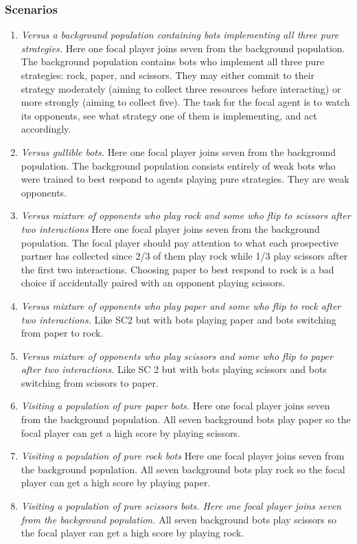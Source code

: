 \documentclass{article} %
\begin{document}
\subsubsection{Scenarios}
\begin{enumerate}
    \item[\textbf{SC0:}] \textit{Versus a background population containing
bots implementing all three pure strategies.}  Here one focal player joins seven from the
background population. The background
population contains bots who implement all
three pure strategies: rock, paper, and scissors. They may either commit to their strategy moderately (aiming to collect three resources before interacting) or more strongly
(aiming to collect five). The task for the focal agent is to watch its opponents, see what
strategy one of them is implementing, and
act accordingly.
    \item[\textbf{SC1:}] \textit{Versus gullible bots.}  Here one focal player
joins seven from the background population. The background population consists
entirely of weak bots who were trained to
best respond to agents playing pure strategies. They are weak opponents.
    \item[\textbf{SC2:}] \textit{Versus mixture of opponents who play rock
and some who flip to scissors after two interactions}  Here one focal player joins seven
from the background population. The focal
player should pay attention to what each
prospective partner has collected since 2/3
of them play rock while 1/3 play scissors
after the first two interactions. Choosing paper to best respond to rock is a bad choice if
accidentally paired with an opponent playing scissors.
    \item[\textbf{SC3:}] \textit{Versus mixture of opponents who play paper
and some who flip to rock after two interactions. }  Like SC2 but with bots playing paper
and bots switching from paper to rock.
    \item[\textbf{SC4:}] \textit{Versus mixture of opponents who play scissors and some who flip to paper after two
interactions. }  Like SC 2 but with bots playing scissors and bots switching from scissors
to paper.
    \item[\textbf{SC5:}] \textit{Visiting a population of pure paper bots.}   Here one focal player joins seven from the
background population. All seven background bots play paper so the focal player
can get a high score by playing scissors.
    \item[\textbf{SC6:}] \textit{Visiting a population of pure rock bots}  Here
one focal player joins seven from the background population. All seven background bots play rock so the focal player can get a
high score by playing paper. 
    \item[\textbf{SC7:}] \textit{Visiting a population of pure scissors bots.
Here one focal player joins seven from the
background population.}  All seven background bots play scissors so the focal player
can get a high score by playing rock.

\end{enumerate}
\end{document}
